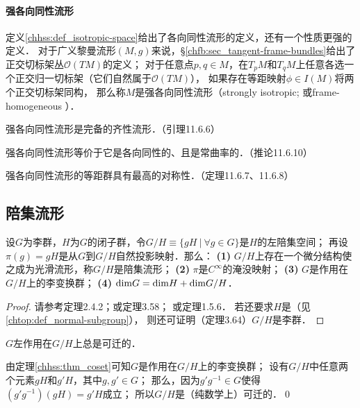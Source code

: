    

\paragraph{强各向同性流形}\label{chhss:sec_fh}
定义\ref{chhss:def_isotropic-space}给出了{\kaishu 各向同性流形}的定义，还有一个性质更强的定义．
对于广义黎曼流形$(M,g)$来说，\S\ref{chfb:sec_tangent-frame-bundles}给出了正交切标架丛$\mathcal{O}(TM)$的定义；
对于任意点$p,q\in M$，在$T_p M$和$T_q M$上任意各选一个正交归一切标架（它们自然属于$\mathcal{O}(TM)$），
如果存在等距映射$\phi\in I(M)$将两个正交切标架同构，
那么称$M$是{\heiti 强各向同性流形}（strongly isotropic; 或frame-homogeneous ）．

强各向同性流形是完备的齐性流形．（\parencite{wolf_SCC-2011}引理11.6.6）

强各向同性流形{\kaishu 等价于}它是各向同性的、且是常曲率的．（\parencite{wolf_SCC-2011}推论11.6.10）

强各向同性流形的等距群具有最高的对称性．（\parencite{wolf_SCC-2011}定理11.6.7、11.6.8）




\subsection{陪集流形}

\begin{theorem}\label{chhss:thm_coset}
    设$G$为李群，$H$为$G$的闭子群，令$G/H\equiv \{g H \ |\ \forall g\in G \}$是$H$的左陪集空间；
    再设$\pi(g)=g H$是从$G$到$G/H${\heiti 自然投影映射}．那么：    
    {\bfseries (1)} $G/H$上存在一个微分结构使之成为光滑流形，称$G/H$是{\heiti 陪集流形}；    
    {\bfseries (2)} $\pi$是$C^\infty$的{\kaishu 淹没}映射；    
    {\bfseries (3)} $G$是作用在$G/H$上的李变换群；        
    {\bfseries (4)} ${\rm dim}G = {\rm dim}H + {\rm dim}G/H$．
\end{theorem}
\begin{proof}
    请参考\parencite{helgason-2001}定理2.4.2；或\parencite{warner-1983-FDMLG}定理3.58；
    或\parencite[\S 1.5]{wolf_SCC-2011}定理1.5.6．
    若还要求$H$是（见\ref{chtop:def_normal-subgroup}），
    则还可证明（\parencite{warner-1983-FDMLG}定理3.64）$G/H$是{\kaishu 李群}．
\end{proof}

\begin{example}\label{chhss:exm_ghtra}
    $G$左作用在$G/H$上总是可迁的．
\end{example}
由定理\ref{chhss:thm_coset}可知$G$是作用在$G/H$上的李变换群；
设有$G/H$中任意两个元素$gH$和$g' H$，其中$g,g'\in G$；
那么，因为$g' g^{-1} \in G$使得$(g' g^{-1}) (gH) = g' H$成立；
所以$G/H$是（纯数学上）可迁的．\qed

